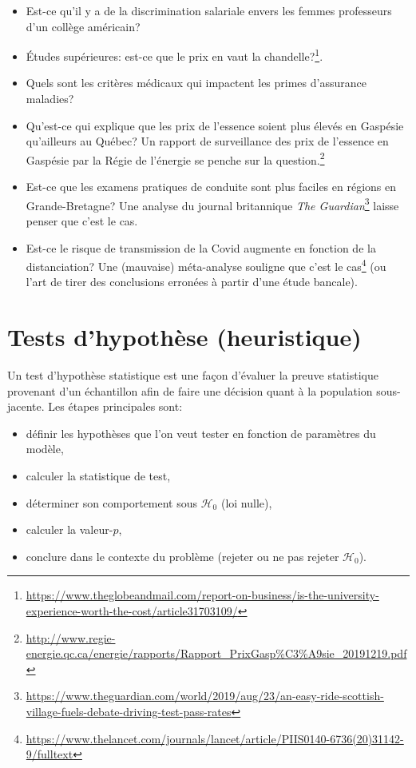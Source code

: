 \documentclass[
  11pt,
  letterpaper,
]{book}
\providecommand{\tightlist}{%
  \setlength{\itemsep}{0pt}\setlength{\parskip}{0pt}}
\renewcommand{\href}[2]{#2\footnote{\url{#1}}}
\begin{document}
\begin{itemize}
\tightlist
\item
  Est-ce qu'il y a de la discrimination salariale envers les femmes professeurs d'un collège américain?
\item
  Études supérieures: \href{https://www.theglobeandmail.com/report-on-business/is-the-university-experience-worth-the-cost/article31703109/}{est-ce que le prix en vaut la chandelle?}.
\item
  Quels sont les critères médicaux qui impactent les primes d'assurance maladies?
\item
  Qu'est-ce qui explique que les prix de l'essence soient plus élevés en Gaspésie qu'ailleurs au Québec? \href{http://www.regie-energie.qc.ca/energie/rapports/Rapport_PrixGasp\%C3\%A9sie_20191219.pdf}{Un rapport de surveillance des prix de l'essence en Gaspésie par la Régie de l'énergie se penche sur la question.}
\item
  Est-ce que les examens pratiques de conduite sont plus faciles en régions en Grande-Bretagne? \href{https://www.theguardian.com/world/2019/aug/23/an-easy-ride-scottish-village-fuels-debate-driving-test-pass-rates}{Une analyse du journal britannique \emph{The Guardian}} laisse penser que c'est le cas.
\item
  Est-ce le risque de transmission de la Covid augmente en fonction de la distanciation? \href{https://www.thelancet.com/journals/lancet/article/PIIS0140-6736(20)31142-9/fulltext}{Une (mauvaise) méta-analyse souligne que c'est le cas} (ou l'art de tirer des conclusions erronées à partir d'une étude bancale).
\end{itemize}

\hypertarget{tests-dhypothuxe8se-heuristique}{%
\section{Tests d'hypothèse (heuristique)}\label{tests-dhypothuxe8se-heuristique}}

Un test d'hypothèse statistique est une façon d'évaluer la preuve statistique provenant d'un échantillon afin de faire une décision quant à la population sous-jacente. Les étapes principales sont:

\begin{itemize}
\tightlist
\item
  définir les hypothèses que l'on veut tester en fonction de paramètres du modèle,
\item
  calculer la statistique de test,
\item
  déterminer son comportement sous \(\mathscr{H}_0\) (loi nulle),
\item
  calculer la valeur-\(p\),
\item
  conclure dans le contexte du problème (rejeter ou ne pas rejeter \(\mathscr{H}_0\)).
\end{itemize}
\end{document}
